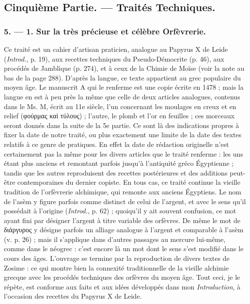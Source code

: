 \documentclass[a4paper, 11pt, oneside, polutonikogreek, french]{article}
\begin{document}
\bigskip
\centerline{\EightStarTaper}
\centerline{\EightStarTaper\EightStarTaper}
\bigskip

\subsection{Cinquième Partie. --- Traités Techniques.}
\subsubsection{5. --- 1. Sur la très précieuse et célèbre Orfèvrerie.}

Ce traité est un cahier d'artisan praticien, analogue au Papyrus X de Leide (\emph{Introd.}, p. 19), aux recettes techniques du Pseudo-Démocrite (p. 46), aux procédés de Jamblique (p. 274), et à ceux de la Chimie de Moïse (voir la note au bas de la page 288). D'après la langue, ce texte appartient au grec populaire du moyen âge. Le manuscrit A qui le renferme est une copie écrite en 1478 ; mais la langue en est à peu près la même que celle de deux articles analogues, contenus dans le Ms. M, écrit au 11e siècle, l'un concernant les moulages en creux et en relief (φούρμας καὶ τύλους) ; l'autre, le plomb et l'or en feuilles ; ces morceaux seront donnés dans la suite de la 5e partie. Ce sont là des indications propres à fixer la date de notre traité, ou plus exactement une limite de la date des textes relatifs à ce genre de pratiques. En effet la date de rédaction originelle n'est certainement pas la même pour les divers articles que le traité renferme : les uns étant plus anciens et remontant parfois jusqu'à l'antiquité gréco Égyptienne ; tandis que les autres reproduisent des recettes postérieures et des additions peut-être contemporaines du dernier copiste. En tous cas, ce traité continue la vieille tradition de l'orfèvrerie alchimique, qui remonte aux anciens Égyptiens. Le nom de l'asèm y figure parfois comme distinct de celui de l'argent, et avec le sens qu'il possédait à l'origine (\emph{Introd.}, p. 62) ; quoiqu'il y ait souvent confusion, ce mot ayant fini par désigner l'argent à titre variable des orfèvres. De même le mot de διάργυρος y désigne parfois un alliage analogue à l'argent et comparable à l'asèm (v. p. 26) ; mais il s'applique dans d'autres passages au mercure lui-même, comme dans le néogrec : c'est encore là un mot dont le sens s'est modifié dans le cours des âges. L'ouvrage se termine par la reproduction de divers textes de Zosime : ce qui montre bien la connexité traditionnelle de la vieille alchimie grecque avec les procédés techniques des orfèvres du moyen âge. Tout ceci, je le répète, est conforme aux faits et aux idées développés dans mon \emph{Introduction}, à l'occasion des recettes du Papyrus X de Leide.
\end{document}
